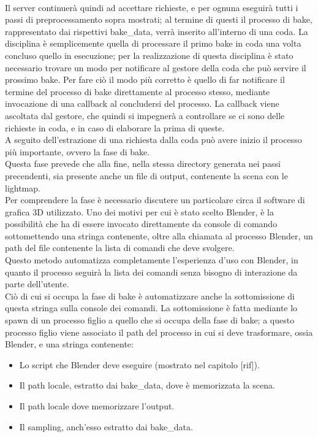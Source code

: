 \\
Il server continuerà quindi ad accettare richieste, e per ognuna eseguirà tutti i passi di preprocessamento sopra mostrati; al termine di questi il processo di bake, rappresentato dai rispettivi bake\_data, verrà inserito all’interno di una coda. La disciplina è semplicemente quella di processare il primo bake in coda una volta concluso quello in esecuzione; per la realizzazione di questa disciplina è stato necessario trovare un modo per notificare al gestore della coda che può servire il prossimo bake. Per fare ciò il modo più corretto è quello di far notificare il termine del processo di bake direttamente al processo stesso, mediante invocazione di una callback al concludersi del processo. La callback viene ascoltata dal gestore, che quindi si impegnerà a controllare se ci sono delle richieste in coda, e in caso di elaborare la prima di queste. 
\\
A seguito dell’estrazione di una richiesta dalla coda può avere inizio il processo più importante, ovvero la fase di bake. 
\\
Questa fase prevede che alla fine, nella stessa directory generata nei passi precendenti, sia presente anche un file di output, contenente la scena con le lightmap. 
\\
Per comprendere la fase è necessario discutere un particolare circa il software di grafica 3D utilizzato. Uno dei motivi per cui è stato scelto Blender, è la possibilità che ha di essere invocato direttamente da console di comando sottomettendo una stringa contenente, oltre alla chiamata al processo Blender, un path del file contenente la lista di comandi che deve svolgere. 
\\
Questo metodo automatizza completamente l’esperienza d’uso con Blender, in quanto il processo seguirà la lista dei comandi senza bisogno di interazione da parte dell’utente.
\\ 
Ciò di cui si occupa la fase di bake è automatizzare anche la sottomissione di questa stringa sulla console dei comandi. La sottomissione è fatta mediante lo spawn di un processo figlio a quello che si occupa della fase di bake; a questo processo figlio viene associato il path del processo in cui si deve trasformare, ossia Blender, e una stringa contenente:
\begin{itemize}
\item Lo script che Blender deve eseguire (mostrato nel capitolo [rif]).
\item Il path locale, estratto dai bake\_data, dove è memorizzata la scena.
\item Il path locale dove memorizzare l’output.
\item Il sampling, anch’esso estratto dai bake\_data.
\end{itemize}
